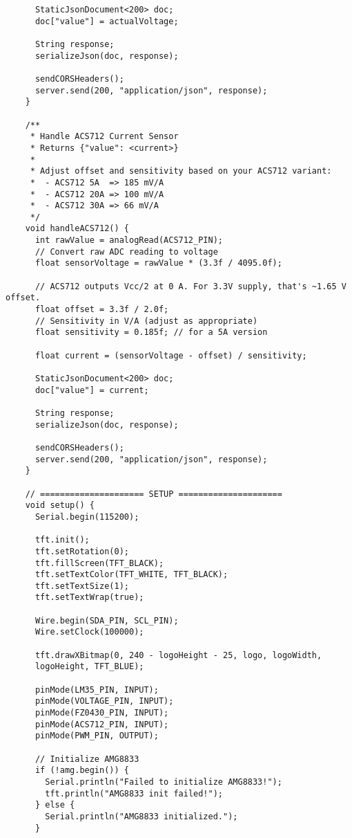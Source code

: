 \begin{verbatim}
      StaticJsonDocument<200> doc;
      doc["value"] = actualVoltage;
    
      String response;
      serializeJson(doc, response);
    
      sendCORSHeaders();
      server.send(200, "application/json", response);
    }
    
    /**
     * Handle ACS712 Current Sensor
     * Returns {"value": <current>}
     * 
     * Adjust offset and sensitivity based on your ACS712 variant:
     *  - ACS712 5A  => 185 mV/A
     *  - ACS712 20A => 100 mV/A
     *  - ACS712 30A => 66 mV/A
     */
    void handleACS712() {
      int rawValue = analogRead(ACS712_PIN);
      // Convert raw ADC reading to voltage
      float sensorVoltage = rawValue * (3.3f / 4095.0f);
    
      // ACS712 outputs Vcc/2 at 0 A. For 3.3V supply, that's ~1.65 V offset.
      float offset = 3.3f / 2.0f;  
      // Sensitivity in V/A (adjust as appropriate)
      float sensitivity = 0.185f; // for a 5A version
    
      float current = (sensorVoltage - offset) / sensitivity;
    
      StaticJsonDocument<200> doc;
      doc["value"] = current;
    
      String response;
      serializeJson(doc, response);
    
      sendCORSHeaders();
      server.send(200, "application/json", response);
    }
    
    // ===================== SETUP =====================
    void setup() {
      Serial.begin(115200);
    
      tft.init();
      tft.setRotation(0);
      tft.fillScreen(TFT_BLACK);
      tft.setTextColor(TFT_WHITE, TFT_BLACK);
      tft.setTextSize(1);
      tft.setTextWrap(true);
    
      Wire.begin(SDA_PIN, SCL_PIN);
      Wire.setClock(100000);
    
      tft.drawXBitmap(0, 240 - logoHeight - 25, logo, logoWidth,
      logoHeight, TFT_BLUE);
    
      pinMode(LM35_PIN, INPUT);
      pinMode(VOLTAGE_PIN, INPUT);
      pinMode(FZ0430_PIN, INPUT);
      pinMode(ACS712_PIN, INPUT);
      pinMode(PWM_PIN, OUTPUT);
    
      // Initialize AMG8833
      if (!amg.begin()) {
        Serial.println("Failed to initialize AMG8833!");
        tft.println("AMG8833 init failed!");
      } else {
        Serial.println("AMG8833 initialized.");
      }
    

\end{verbatim}
